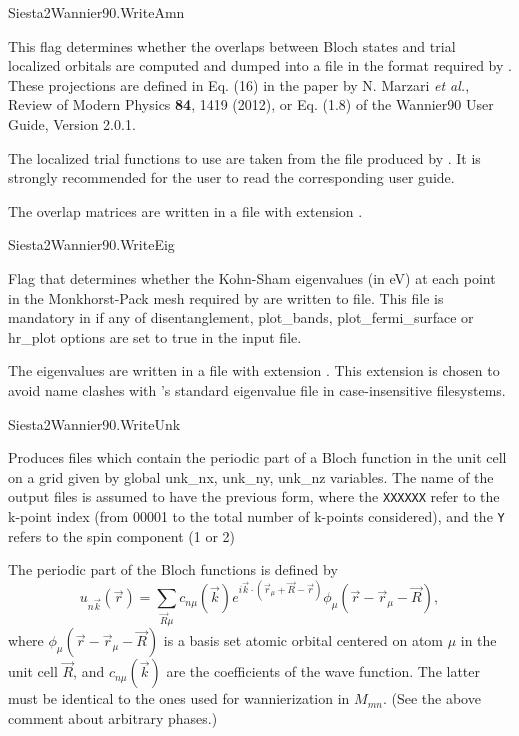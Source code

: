   \begin{fdflogicalF}{Siesta2Wannier90.WriteAmn}

    This flag determines whether the overlaps between Bloch states and
    trial localized orbitals are computed and dumped into a file in the
    format required by .  These projections are
    defined in Eq. (16) in the paper by N. Marzari \textit{et al.},
    Review of Modern Physics \textbf{84}, 1419 (2012), or Eq. (1.8) of
    the Wannier90 User Guide, Version 2.0.1.

    The localized trial functions to use are taken from the
     file produced by . It is strongly
    recommended for the user to read the corresponding user guide.

    The overlap matrices are written in a file with extension
    .

  \end{fdflogicalF}

  \begin{fdflogicalF}{Siesta2Wannier90.WriteEig}

    Flag that determines whether the Kohn-Sham eigenvalues (in eV) at
    each point in the Monkhorst-Pack mesh required by
     are written to file.  This file is mandatory in
     if any of disentanglement, plot\_bands,
    plot\_fermi\_surface or hr\_plot options are set to true in the
     input file.

    The eigenvalues are written in a file with extension .
    This extension is chosen to avoid name clashes with \siesta's
    standard eigenvalue file in case-insensitive filesystems.

  \end{fdflogicalF}

  \begin{fdflogicalF}{Siesta2Wannier90.WriteUnk}

    Produces  files which contain the periodic part
    of a Bloch function in the unit cell on a grid given by global
    unk\_nx, unk\_ny, unk\_nz variables.  The name of the output files
    is assumed to have the previous form, where the \texttt{XXXXXX}
    refer to the k-point index (from 00001 to the total number of
    k-points considered), and the \texttt{Y} refers to the spin
    component (1 or 2)

    The periodic part of the Bloch functions is defined by
    \begin{equation}
      u_{n \vec{k}} (\vec{r}) =
      \sum_{\vec{R} \mu} c_{n \mu}(\vec{k})
      e^{i \vec{k} \cdot ( \vec{r}_{\mu} + \vec{R} - \vec{r} )}
      \phi_{\mu} (\vec{r} - \vec{r}_{\mu} - \vec{R} ) ,
    \end{equation}
    where $\phi_{\mu} (\vec{r} - \vec{r}_{\mu} - \vec{R} )$ is a basis
    set atomic orbital centered on atom $\mu$ in the unit cell
    $\vec{R}$, and $c_{n \mu}(\vec{k})$ are the coefficients of the wave
    function. The latter must be identical to the ones used for
    wannierization in $M_{mn}$. (See the above comment about arbitrary
    phases.)

  \end{fdflogicalF}

